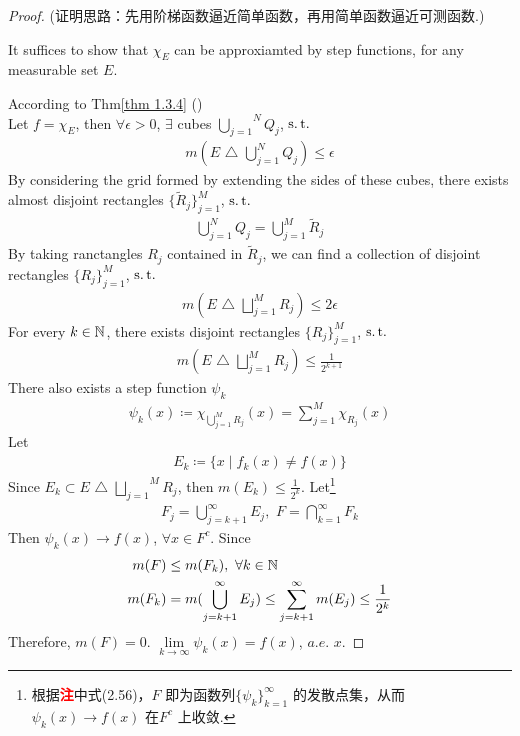 \begin{thm}
		\vspace{2em}
		\begin{proof}
			(证明思路：先用阶梯函数逼近简单函数，再用简单函数逼近可测函数.)
			\begin{center}
				It suffices to show that $\chi_E$ can be approxiamted by step functions, for any measurable set $E$.
			\end{center}
			According to Thm\ref{thm 1.3.4} () \\
			Let $f = \chi_E$, then $\forall \epsilon > 0$, $\exists$ cubes $\overset{N}{\underset{j = 1}{\bigcup}}{Q_j}$, $\operatorname{s.t.}$
			\begin{align}
				m(E \,\, \triangle \,\, \bigcup_{j = 1}^{N}{Q_j}) \leq \epsilon
			\end{align}
			By considering the grid formed by extending the sides of these cubes, there exists almost disjoint rectangles $\{ \widetilde{R}_j \}_{j = 1}^{M}$, $\operatorname{s.t.}$
			\begin{align}
				\bigcup_{j = 1}^{N}{Q_j} = \bigcup_{j = 1}^{M}{\widetilde{R}_j}
			\end{align}
			By taking ranctangles $R_j$ contained in $\widetilde{R}_j$, we can find a collection of disjoint rectangles $\{ R_j \}_{j = 1}^{M}$, $\operatorname{s.t.}$
			\begin{align}
				m(E \,\, \triangle \,\, \bigsqcup_{j = 1}^{M}{R_j}) \leq 2\epsilon
			\end{align}
			For every $k \in \mathbb{N}$, there exists disjoint rectangles $\{ R_j \}_{j = 1}^{M}$, $\operatorname{s.t.}$
			\begin{align}
				m(E \,\, \triangle \,\, \bigsqcup_{j = 1}^{M}{R_j}) \leq \frac{1}{2^{k + 1}}
			\end{align}
			There also exists a step function $\psi_k$
			\begin{align}
				\psi_{k}(x) \coloneqq \chi_{\bigcup_{j = 1}^{M}{R_j}}(x) = \sum_{j = 1}^{M}{\chi_{R_j}(x)}
			\end{align}
			Let
			\begin{align}
				E_k \coloneqq \{ x \mid f_{k}(x) \neq f(x) \}
			\end{align}
			Since $E_k \subset E \,\, \triangle \,\, \overset{M}{\underset{j = 1}{\bigsqcup}}{R_j}$, then $m(E_k) \leq \frac{1}{2^k}$. Let\footnote{根据\textcolor{red}{\textbf{注}}中式(2.56)，$F$ 即为函数列$\{ \psi_k \}_{k = 1}^{\infty}$ 的发散点集，从而$\psi_{k}(x) \to f(x)$ 在$F^c$ 上收敛.}
			\begin{align}
				F_j = \bigcup_{j = k + 1}^{\infty}{E_j} , \,\, F = \bigcap_{k = 1}^{\infty}{F_k}
			\end{align}
			Then $\psi_{k}(x) \to f(x)$, $\forall x \in F^c$. Since
			\begin{align}
				m(F) &\leq m(F_k) , \,\, \forall k \in \mathbb{N} \\
				m(F_k) &= m(\bigcup_{j = k + 1}^{\infty}{E_j}) \leq \sum_{j = k + 1}^{\infty}{m(E_j)} \leq \frac{1}{2^k}
			\end{align}
			Therefore, $m(F) = 0$. $\underset{k \to \infty}{\lim}{\psi_{k}(x)} = f(x)$, $a.e.$ $x$.
		\end{proof}
	\end{thm}






	\ifx\allfiles\undefined

\fi